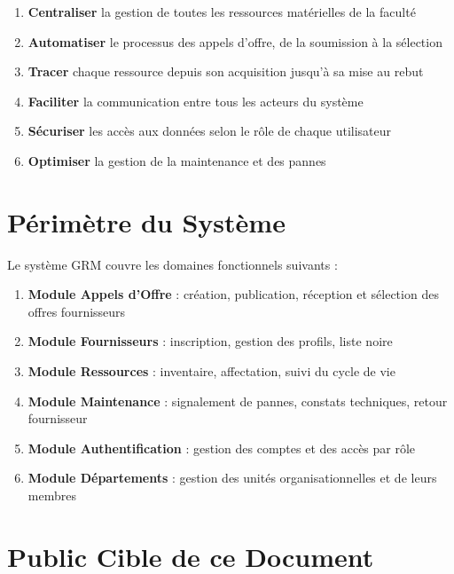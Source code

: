 \documentclass[12pt,a4paper]{report}
\begin{document}
\begin{enumerate}[leftmargin=1.5cm]
    \item \textbf{Centraliser} la gestion de toutes les ressources matérielles de la faculté
    \item \textbf{Automatiser} le processus des appels d'offre, de la soumission à la sélection
    \item \textbf{Tracer} chaque ressource depuis son acquisition jusqu'à sa mise au rebut
    \item \textbf{Faciliter} la communication entre tous les acteurs du système
    \item \textbf{Sécuriser} les accès aux données selon le rôle de chaque utilisateur
    \item \textbf{Optimiser} la gestion de la maintenance et des pannes
\end{enumerate}

\section{Périmètre du Système}

Le système GRM couvre les domaines fonctionnels suivants :

\begin{tcolorbox}[exigbox, title=Domaines couverts par le système]
\begin{enumerate}
    \item \textbf{Module Appels d'Offre} : création, publication, réception et sélection des offres fournisseurs
    \item \textbf{Module Fournisseurs} : inscription, gestion des profils, liste noire
    \item \textbf{Module Ressources} : inventaire, affectation, suivi du cycle de vie
    \item \textbf{Module Maintenance} : signalement de pannes, constats techniques, retour fournisseur
    \item \textbf{Module Authentification} : gestion des comptes et des accès par rôle
    \item \textbf{Module Départements} : gestion des unités organisationnelles et de leurs membres
\end{enumerate}
\end{tcolorbox}

\section{Public Cible de ce Document}
\end{document}
